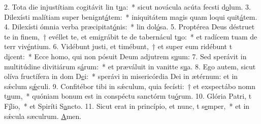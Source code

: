2. Tota die injustítiam cogitávit lin t\uline{u}a:~* sicut novácula acúta fecsti d\uline{o}lum.
3. Dilexísti malítiam super benignt\uline{á}tem:~* iniquitátem magis quam loqui quit\uline{á}tem.
4. Dilexísti ómnia verba præcipitat\uline{ó}nis:~* lin dol\uline{ó}sa.
5. Proptérea Deus déstruet te in finem,~† evéllet te, et emigrábit te de tabernácul t\uline{u}o:~* et radícem tuam de terr viv\uline{é}ntium.
6. Vidébunt justi, et timébunt,~† et super eum ridébunt t d\uline{i}cent:~* Ecce homo, qui non pósuit Deum adjutrem s\uline{u}um:
7. Sed sperávit in multitúdine divitiárum s\uline{á}rum:~* et præváluit in vanitte s\uline{u}a.
8. Ego autem, sicut olíva fructífera in dom D\uline{e}i:~* sperávi in misericórdia Dei in ætérnum: et in sǽclum s\uline{ǽ}culi.
9. Confitébor tibi in sǽculum, quia fecísti:~† et exspectábo nomn t\uline{u}um,~* quóniam bonum est in conspéctu sanctórm tu\uline{ó}rum.
10. Glória Patri, t F\uline{í}lio,~* et Spiríti S\uline{a}ncto.
11. Sicut erat in princípio, et nunc, t s\uline{e}mper,~* et in sǽcula sæculrum. \uline{A}men.
